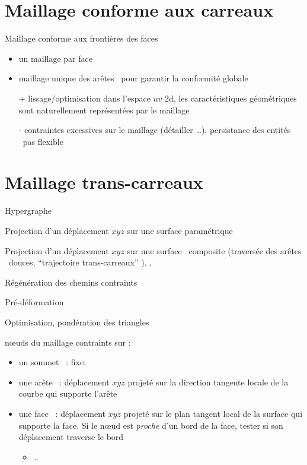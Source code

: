 \section{Maillage conforme aux carreaux}
Maillage conforme aux frontières des faces \brep\ \cite{andrieu2017}
\begin{itemize}
	\item un maillage par face \brep
	\item maillage unique des arêtes \brep\ pour garantir la conformité globale
	\item[+] lissage/optimisation dans l'espace $uv$ 2d, les caractéristiques géométriques sont naturellement représentées par le maillage
	\item[-] contraintes excessives sur le maillage (détailler \ldots), persistance des entités \brep\  pas flexible
\end{itemize}

\section{Maillage trans-carreaux}
Hypergraphe \cite{foucault2008}\par
Projection d'un déplacement $xyz$ sur une surface paramétrique\par
Projection d'un déplacement $xyz$ sur une surface \brep\ composite (traversée des arêtes \brep\ douces, ``trajectoire trans-carreaux'' \cite[Section~5.5]{foucault2008}), \cite{thompson2005}, \cite[p.42 et Section~4.4.1]{crozet2017}\par
Régénération des chemins contraints\par
Pré-déformation\par
Optimisation, pondération des triangles

\par\bigskip
n\oe uds du maillage contraints sur :
\begin{itemize}
	\item un sommet \brep\ : fixe;
	\item une arête \brep\ : déplacement $xyz$ projeté sur la direction tangente locale de la courbe qui supporte l'arête
	\item une face \brep\ : déplacement $xyz$ projeté sur le plan tangent local de la surface qui supporte la face. 
	Si le n\oe ud est \textit{proche} d'un bord de la face, tester si son déplacement traverse le bord
	\begin{itemize}
		\item \ldots
	\end{itemize}
\end{itemize}
